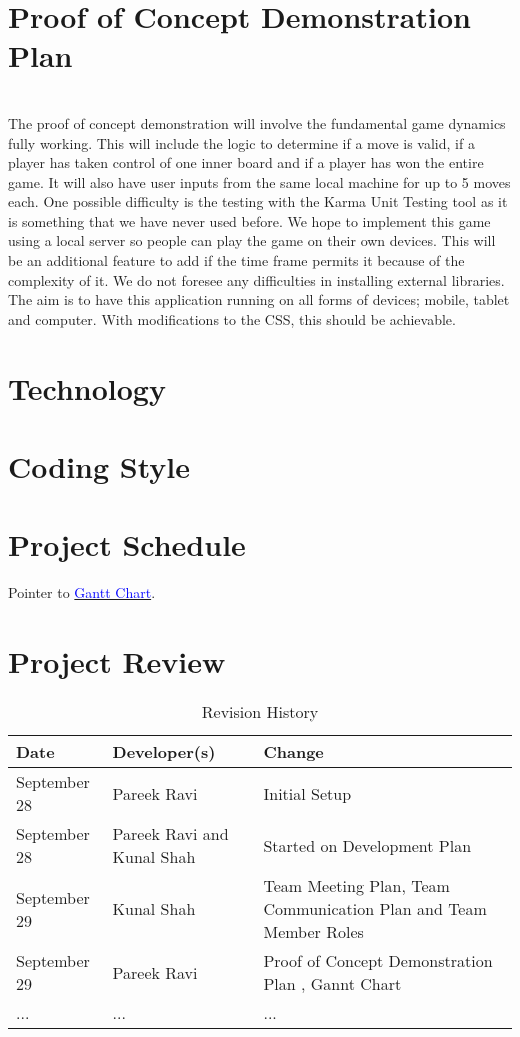 \documentclass{article}
\begin{document}
\section{Proof of Concept Demonstration Plan}\\
The proof of concept demonstration will involve the fundamental game dynamics 
fully working. This will include the logic to determine if a move is valid, if a 
player has taken control of one inner board and if a player has won the entire 
game. It will also have user inputs from the same local machine for up to 5 
moves each. One possible difficulty is the testing with the Karma Unit Testing 
tool as it is something that we have never used before. We hope to implement 
this game using a local server so people can play the game on their own devices. 
This will be an additional feature to add if the time frame permits it because 
of the complexity of it. We do not foresee any difficulties in installing 
external libraries. The aim is to have this application running on all forms of 
devices; mobile, tablet and computer. With modifications to the CSS, this should 
be achievable. \\

\section{Technology}

\section{Coding Style}

\section{Project Schedule}

Pointer to \href{run:Gantt Chart.gan}{\textcolor{blue}{Gantt Chart}}.

\section{Project Review}

\newpage

\begin{table}[hp]
\caption{Revision History} \label{TblRevisionHistory}
\begin{tabularx}{\textwidth}{llX}
\toprule
\textbf{Date} & \textbf{Developer(s)} & \textbf{Change}\\
\midrule
September 28 & Pareek Ravi & Initial Setup\\
September 28 & Pareek Ravi and Kunal Shah & Started on Development Plan\\
September 29 & Kunal Shah & Team Meeting Plan, Team Communication Plan and Team Member Roles\\
September 29 & Pareek Ravi & Proof of Concept Demonstration Plan , Gannt Chart\\
... & ... & ...\\
\bottomrule
\end{tabularx}
\end{table}
\end{document}
